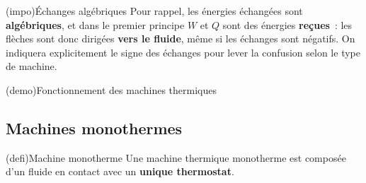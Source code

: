 \documentclass[../../main/main.tex]{subfiles}
\begin{document}
\begin{tcb*}[sidebyside]
\begin{center}
{		}
	\end{center}
\end{tcb*}

\begin{tcb*}(impo){Échanges algébriques}
	Pour rappel, les énergies échangées sont \textbf{algébriques}, et dans le
	premier principe $W$ et $Q$ sont des énergies \textbf{reçues}~: les flèches
	sont donc dirigées \textbf{vers le fluide}, même si les échanges sont
	négatifs. On indiquera explicitement le signe des échanges pour lever la
	confusion selon le type de machine.
\end{tcb*}

\begin{tcb*}[sidebyside, sidebyside align=top](demo){Fonctionnement des machines thermiques}
	\vspace{-15pt}
	\vspace{-15pt}
	\tcblower
	\vspace{-15pt}
	\vspace{-15pt}
\end{tcb*}

\subsection{Machines monothermes}
\begin{tcb*}(defi){Machine monotherme}
	Une machine thermique monotherme est composée d'un fluide en contact avec un
	\textbf{unique thermostat}.
\end{tcb*}
\end{document}
